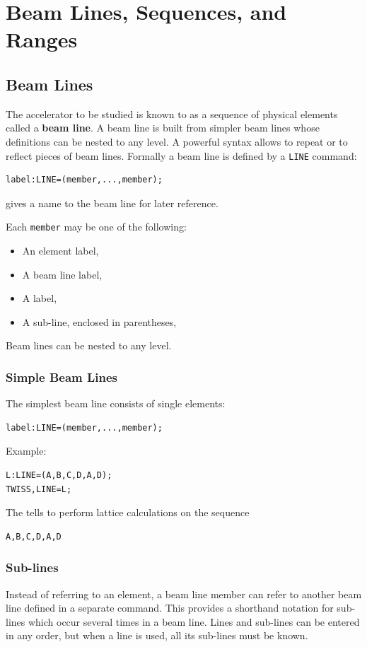 \chapter{Beam Lines, Sequences, and Ranges}
\label{sec:lines}

\section{Beam Lines}
\label{sec:line}

The accelerator to be studied is known to \opal
as a sequence of physical elements called a \textbf{beam line}.
A beam line is built from simpler beam lines whose definitions
can be nested to any level.
A powerful syntax allows to repeat or to reflect pieces of beam lines.
Formally a beam line is defined by a \texttt{LINE} command:
\begin{verbatim}
label:LINE=(member,...,member);
\end{verbatim}
 gives a name to the beam line 
for later reference.

Each \texttt{member} may be one of the following:
\begin{itemize}
\item An element label,
\item A beam line label,
\item A  label,
\item A sub-line, enclosed in parentheses,
\end{itemize}
Beam lines can be nested to any level.

\subsection{Simple Beam Lines}
\label{sec:simple}
The simplest beam line consists of single elements:
\begin{verbatim}
label:LINE=(member,...,member);
\end{verbatim}
Example:
\begin{verbatim}
L:LINE=(A,B,C,D,A,D);
TWISS,LINE=L;
\end{verbatim}
The  tells \opal to perform
lattice calculations on the sequence 
\begin{verbatim}
A,B,C,D,A,D
\end{verbatim}

\subsection{Sub-lines}
\label{sec:subline}
Instead of referring to an element,
a beam line member can refer to another beam line
defined in a separate command.
This provides a shorthand notation for sub-lines which occur
several times in a beam line.
Lines and sub-lines can be entered in any order,
but when a line is used,
all its sub-lines must be known.

